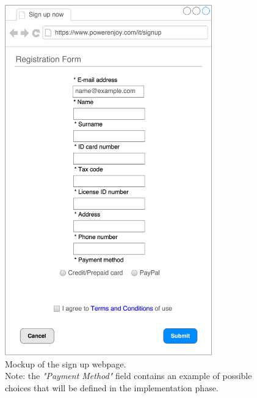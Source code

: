 \begin{figure}[H]
\begin{center}
		\includegraphics[width=0.8\textwidth]{./specific_requirements/features/diagrams/web_registration.png}
		\caption{Mockup of the sign up webpage.\\Note: the \emph{"Payment Method"} field contains an example of possible choices that will be defined in the implementation phase.}
\end{center}
\end{figure}